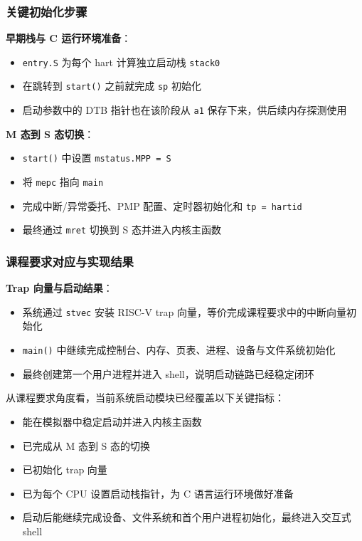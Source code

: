 \documentclass[12pt,a4paper]{ctexart}
\begin{document}
\subsubsection{关键初始化步骤}

\textbf{早期栈与 C 运行环境准备}：
\begin{itemize}
  \item \texttt{entry.S} 为每个 hart 计算独立启动栈 \texttt{stack0}
  \item 在跳转到 \texttt{start()} 之前就完成 \texttt{sp} 初始化
  \item 启动参数中的 DTB 指针也在该阶段从 \texttt{a1} 保存下来，供后续内存探测使用
\end{itemize}

\textbf{M 态到 S 态切换}：
\begin{itemize}
  \item \texttt{start()} 中设置 \texttt{mstatus.MPP = S}
  \item 将 \texttt{mepc} 指向 \texttt{main}
  \item 完成中断/异常委托、PMP 配置、定时器初始化和 \texttt{tp = hartid}
  \item 最终通过 \texttt{mret} 切换到 S 态并进入内核主函数
\end{itemize}

\subsubsection{课程要求对应与实现结果}

\textbf{Trap 向量与启动结果}：
\begin{itemize}
  \item 系统通过 \texttt{stvec} 安装 RISC-V trap 向量，等价完成课程要求中的中断向量初始化
  \item \texttt{main()} 中继续完成控制台、内存、页表、进程、设备与文件系统初始化
  \item 最终创建第一个用户进程并进入 shell，说明启动链路已经稳定闭环
\end{itemize}

从课程要求角度看，当前系统启动模块已经覆盖以下关键指标：
\begin{itemize}
  \item 能在模拟器中稳定启动并进入内核主函数
  \item 已完成从 M 态到 S 态的切换
  \item 已初始化 trap 向量
  \item 已为每个 CPU 设置启动栈指针，为 C 语言运行环境做好准备
  \item 启动后能继续完成设备、文件系统和首个用户进程初始化，最终进入交互式 shell
\end{itemize}
\end{document}
